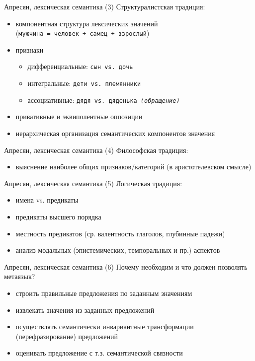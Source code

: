 \documentclass{beamer}
\begin{document}
\begin{frame}{Апресян, лексическая семантика (3)}
Структуралистская традиция:\\
\bigskip
\begin{itemize}
  \item компонентная структура лексических значений\\ {\footnotesize (\texttt{мужчина = человек + самец + взрослый})}
  \item признаки
    \begin{itemize}
      \item дифференциальные: {\footnotesize \texttt{cын vs. дочь}}
      \item интегральные: {\footnotesize \texttt{дети vs. племянники}}
      \item ассоциативные: {\footnotesize \texttt{дядя vs. дяденька \textit{(обращение)}}}
    \end{itemize}
  \item привативные и эквиполентные оппозиции
  \item иерархическая организация семантических компонентов значения
\end{itemize}
\end{frame}

\begin{frame}{Апресян, лексическая семантика (4)}
Философская традиция:\\
\begin{itemize}
  \item выяснение наиболее общих признаков/категорий (в аристотелевском смысле)
\end{itemize}
\end{frame}

\begin{frame}{Апресян, лексическая семантика (5)}
Логическая традиция:\\
\bigskip
\begin{itemize}
  \item имена vs. предикаты
  \item предикаты высшего порядка
  \item местность предикатов (ср. валентность глаголов, глубинные падежи)
  \item анализ модальных (эпистемических, темпоральных и пр.) аспектов
\end{itemize}
\end{frame}

\begin{frame}{Апресян, лексическая семантика (6)}
Почему необходим и что должен позволять метаязык?\\
\bigskip
\begin{itemize}
  \item строить правильные предложения по заданным значениям
  \item извлекать значения из заданных предложений
  \item осуществлять семантически инвариантные трансформации (перефразирование) предложений
  \item оценивать предложение с т.з. семантической связности
\end{itemize}
\end{frame}
\end{document}
